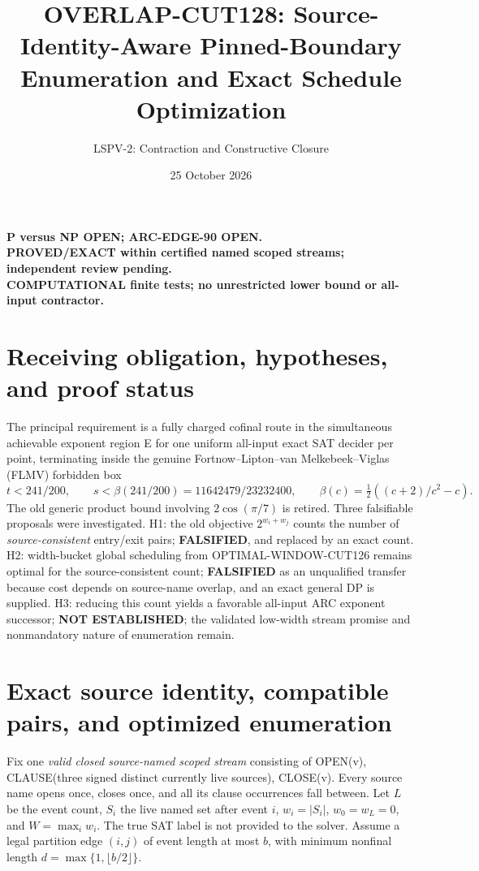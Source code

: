 \documentclass[11pt]{article}
\title{OVERLAP-CUT128: Source-Identity-Aware Pinned-Boundary Enumeration and Exact Schedule Optimization}
\author{LSPV-2: Contraction and Constructive Closure}
\date{25 October 2026}
\begin{document}
\maketitle
\begin{center}
\textbf{P versus NP OPEN; ARC-EDGE-90 OPEN.}\\
\textbf{PROVED/EXACT within certified named scoped streams; independent review pending.}\\
\textbf{COMPUTATIONAL finite tests; no unrestricted lower bound or all-input contractor.}
\end{center}

\section{Receiving obligation, hypotheses, and proof status}
The principal requirement is a fully charged cofinal route in the simultaneous achievable exponent region E for one uniform all-input exact SAT decider per point, terminating inside the genuine Fortnow--Lipton--van Melkebeek--Viglas (FLMV) forbidden box
\[
 t<241/200,\qquad s<\beta(241/200)=11642479/23232400,\qquad
 \beta(c)=\tfrac12((c+2)/c^2-c).
\]
The old generic product bound involving \(2\cos(\pi/7)\) is retired. Three falsifiable proposals were investigated. H1: the old objective \(2^{w_i+w_j}\) counts the number of \emph{source-consistent} entry/exit pairs; \textbf{FALSIFIED}, and replaced by an exact count. H2: width-bucket global scheduling from OPTIMAL-WINDOW-CUT126 remains optimal for the source-consistent count; \textbf{FALSIFIED} as an unqualified transfer because cost depends on source-name overlap, and an exact general DP is supplied. H3: reducing this count yields a favorable all-input ARC exponent successor; \textbf{NOT ESTABLISHED}; the validated low-width stream promise and nonmandatory nature of enumeration remain.

\section{Exact source identity, compatible pairs, and optimized enumeration}
Fix one \emph{valid closed source-named scoped stream} consisting of OPEN(v), CLAUSE(three signed distinct currently live sources), CLOSE(v). Every source name opens once, closes once, and all its clause occurrences fall between. Let \(L\) be the event count, \(S_i\) the live named set after event \(i\), \(w_i=|S_i|\), \(w_0=w_L=0\), and \(W=\max_i w_i\). The true SAT label is not provided to the solver. Assume a legal partition edge \((i,j)\) of event length at most \(b\), with minimum nonfinal length \(d=\max\{1,\lfloor b/2\rfloor\}\).
\end{document}
